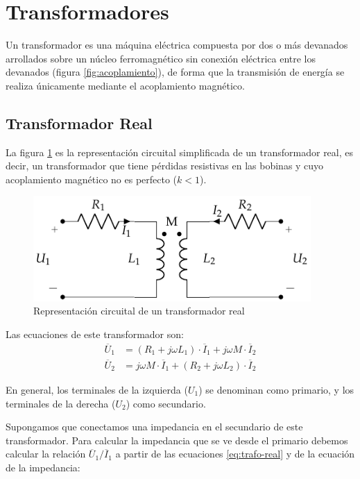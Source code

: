 \section{Transformadores}
\label{sec:transformadores}

Un transformador es una máquina eléctrica compuesta por dos o más
devanados arrollados sobre un núcleo ferromagnético sin conexión
eléctrica entre los devanados (figura \ref{fig:acoplamiento}), de
forma que la transmisión de energía se realiza únicamente mediante el
acoplamiento magnético.

\subsection{Transformador Real}
\label{sec:transformador-real}

La figura \ref{fig:trafo-real} es la representación circuital
simplificada de un transformador real, es decir, un transformador que
tiene pérdidas resistivas en las bobinas y cuyo acoplamiento magnético
no es perfecto ($k < 1$).

\begin{figure}
  \centering
  \includegraphics[height=4cm]{../figs/Trafo_Real.pdf}
  \caption{Representación circuital de un transformador real}
  \label{fig:trafo-real}
\end{figure}
Las ecuaciones de este transformador son:
\begin{align}
  \label{eq:trafo-real}
  \overline{U}_1 &= (R_1 + j \omega L_1) \cdot \overline{I}_1 + j \omega M \cdot\overline{I}_2\\
  \overline{U}_2 &= j \omega M \cdot \overline{I}_1 + (R_2 + j \omega L_2) \cdot \overline{I}_2
\end{align}

En general, los terminales de la izquierda ($U_1$) se denominan como
primario, y los terminales de la derecha ($U_2$) como secundario.

Supongamos que conectamos una impedancia en el secundario de este
transformador. Para calcular la impedancia que se ve desde el primario
debemos calcular la relación $\overline{U}_1/\overline{I}_1$ a partir
de las ecuaciones \ref{eq:trafo-real} y de la ecuación de la
impedancia:

